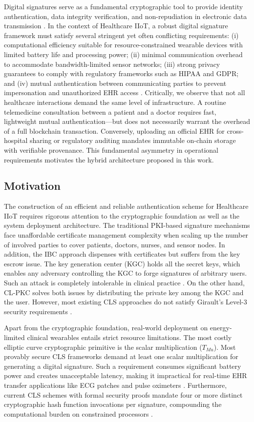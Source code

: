 \documentclass[conference]{IEEEtran}
\begin{document}
Digital signatures serve as a fundamental cryptographic tool to provide identity authentication, data integrity verification, and non-repudiation in electronic data transmission \cite{ref9}. In the context of Healthcare IIoT, a robust digital signature framework must satisfy several stringent yet often conflicting requirements: (i) computational efficiency suitable for resource-constrained wearable devices with limited battery life and processing power; (ii) minimal communication overhead to accommodate bandwidth-limited sensor networks; (iii) strong privacy guarantees to comply with regulatory frameworks such as HIPAA and GDPR; and (iv) mutual authentication between communicating parties to prevent impersonation and unauthorized EHR access \cite{ref10,ref11}. Critically, we observe that not all healthcare interactions demand the same level of infrastructure. A routine telemedicine consultation between a patient and a doctor requires fast, lightweight mutual authentication---but does not necessarily warrant the overhead of a full blockchain transaction. Conversely, uploading an official EHR for cross-hospital sharing or regulatory auditing mandates immutable on-chain storage with verifiable provenance. This fundamental asymmetry in operational requirements motivates the hybrid architecture proposed in this work.


\subsection{Motivation}

The construction of an efficient and reliable authentication scheme for Healthcare IIoT requires rigorous attention to the cryptographic foundation as well as the system deployment architecture. The traditional PKI-based signature mechanisms face unaffordable certificate management complexity when scaling up the number of involved parties to cover patients, doctors, nurses, and sensor nodes. In addition, the IBC approach dispenses with certificates but suffers from the key escrow issue. The key generation center (KGC) holds all the secret keys, which enables any adversary controlling the KGC to forge signatures of arbitrary users. Such an attack is completely intolerable in clinical practice \cite{ref12}. On the other hand, CL-PKC solves both issues by distributing the private key among the KGC and the user. However, most existing CLS approaches do not satisfy Girault's Level-3 security requirements \cite{ref13}.

Apart from the cryptographic foundation, real-world deployment on energy-limited clinical wearables entails strict resource limitations. The most costly elliptic curve cryptographic primitive is the scalar multiplication ($T_{Mu}$). Most provably secure CLS frameworks demand at least one scalar multiplication for generating a digital signature. Such a requirement consumes significant battery power and creates unacceptable latency, making it impractical for real-time EHR transfer applications like ECG patches and pulse oximeters \cite{ref14}. Furthermore, current CLS schemes with formal security proofs mandate four or more distinct cryptographic hash function invocations per signature, compounding the computational burden on constrained processors \cite{ref15}.
\end{document}

